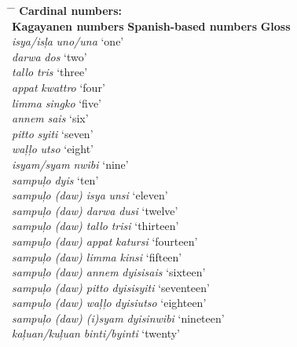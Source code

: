 \begin{tabbing}
\hspace{4cm} \= \hspace{4cm} \= \kill 
\textbf{Cardinal numbers:} \\
\textbf{Kagayanen numbers   }                   \> \textbf{Spanish-based numbers} \> \textbf{Gloss} \\
\textit{isya/isļa              }       \> \textit{uno/una } \>  ‘one’ \\
\textit{darwa                  }       \> \textit{dos} \> ‘two’ \\
\textit{tallo                  }       \> \textit{tris } \>  ‘three’ \\
\textit{appat                  }       \> \textit{kwattro } \>  ‘four’ \\
\textit{limma                  }       \> \textit{singko } \>  ‘five’ \\
\textit{annem                  }       \> \textit{sais } \>  ‘six’ \\
\textit{pitto                  }       \> \textit{syiti } \>  ‘seven’ \\
\textit{waļļo                  }       \> \textit{utso } \>  ‘eight’ \\
\textit{isyam/syam             }       \> \textit{nwibi } \>  ‘nine’ \\
\textit{sampuļo                }       \> \textit{dyis } \>  ‘ten’ \\
\textit{sampuļo (daw) isya     }       \> \textit{unsi } \>  ‘eleven’ \\
\textit{sampuļo (daw) darwa    }       \> \textit{dusi } \>  ‘twelve’ \\
\textit{sampuļo (daw) tallo    }       \> \textit{trisi } \>  ‘thirteen’ \\
\textit{sampuļo (daw) appat    }       \> \textit{katursi } \>  ‘fourteen’ \\
\textit{sampuļo (daw) limma    }       \> \textit{kinsi } \>  ‘fifteen’ \\
\textit{sampuļo (daw) annem    }       \> \textit{dyisisais } \>  ‘sixteen’ \\
\textit{sampuļo (daw) pitto    }       \> \textit{dyisisyiti } \>  ‘seventeen’ \\
\textit{sampuļo (daw) waļļo    }       \> \textit{dyisiutso } \>  ‘eighteen’ \\
\textit{sampuļo (daw) (i)syam  }       \> \textit{dyisinwibi } \>  ‘nineteen’ \\
\textit{kaļuan/kuļuan          }       \> \textit{binti/byinti } \>  ‘twenty’ \\

\end{tabbing}

